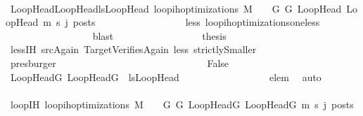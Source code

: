 \begin{isabellebody}
\ \ \ \ \ \ \ \ \ \ \ \ \ \ \isamarkupfalse%
\ {\isachardoublequoteopen}{\isasymforall}{\isacharparenleft}{\kern0pt}LoopHead{\isacharcomma}{\kern0pt}LoopHead{\isacharprime}{\kern0pt}{\isacharparenright}{\kern0pt}{\isasymin}lsLoopHead{\isachardot}{\kern0pt}\ loop{\isacharunderscore}{\kern0pt}ih{\isacharunderscore}{\kern0pt}optimizations\ M\ {\isasymLambda}\ {\isasymGamma}\ {\isasymOmega}\ G\ G{\isacharprime}{\kern0pt}\ LoopHead\ LoopHead{\isacharprime}{\kern0pt}\ m{\isacharprime}{\kern0pt}\ s{\isacharprime}{\kern0pt}\ {\isacharparenleft}{\kern0pt}j{\isacharminus}{\kern0pt}{}{\isacharparenright}{\kern0pt}\ posts{\isachardoublequoteclose}\isanewline
\ \ \ \ \ \ \ \ \ \ \ \ \ \ \ \ \isamarkupfalse%
\ less{\isacharparenleft}{\kern0pt}{}{\isacharparenright}{\kern0pt}\ loop{\isacharunderscore}{\kern0pt}ih{\isacharunderscore}{\kern0pt}optimizations{\isacharunderscore}{\kern0pt}one{\isacharunderscore}{\kern0pt}less\isanewline
\ \ \ \ \ \ \ \ \ \ \ \ \ \ \ \ \isamarkupfalse%
\ blast\isanewline
\ \ \ \ \ \ \ \ \ \ \ \ \ \ \isamarkupfalse%
\ \isamarkupfalse%
\ {\isacharquery}{\kern0pt}thesis\isanewline
\ \ \ \ \ \ \ \ \ \ \ \ \ \ \ \ \isamarkupfalse%
\ less{\isachardot}{\kern0pt}IH\ srcAgain\ TargetVerifiesAgain\ less{\isacharparenleft}{\kern0pt}{}{\isacharparenright}{\kern0pt}\ strictlySmaller\isanewline
\ \ \ \ \ \ \ \ \ \ \ \ \ \ \ \ \isamarkupfalse%
\ presburger\isanewline
\ \ \ \ \ \ \ \ \ \ \ \ \isamarkupfalse%
\ \isanewline
\ \ \ \ \ \ \ \ \ \ \ \ \ \ \isamarkupfalse%
\ False\isanewline
\ \ \ \ \ \ \ \ \ \ \ \ \ \ \isamarkupfalse%
\ {\isachardoublequoteopen}{\isacharparenleft}{\kern0pt}LoopHeadG{\isacharcomma}{\kern0pt}\ LoopHeadG{\isacharprime}{\kern0pt}{\isacharparenright}{\kern0pt}\ {\isasymin}\ {\isacharparenleft}{\kern0pt}lsLoopHead{\isacharparenright}{\kern0pt}{\isachardoublequoteclose}\isanewline
\ \ \ \ \ \ \ \ \ \ \ \ \ \ \ \ \isamarkupfalse%
\ elem\ \isamarkupfalse%
\ auto\isanewline
\ \ \ \ \ \ \ \ \ \ \ \ \ \ \isamarkupfalse%
\ loopIH{\isacharcolon}{\kern0pt}\ {\isachardoublequoteopen}loop{\isacharunderscore}{\kern0pt}ih{\isacharunderscore}{\kern0pt}optimizations\ M\ {\isasymLambda}\ {\isasymGamma}\ {\isasymOmega}\ G\ G{\isacharprime}{\kern0pt}\ LoopHeadG\ LoopHeadG{\isacharprime}{\kern0pt}\ m{\isacharprime}{\kern0pt}\ s{\isacharprime}{\kern0pt}\ j\ posts{\isachardoublequoteclose}\isanewline

\end{isabellebody}
